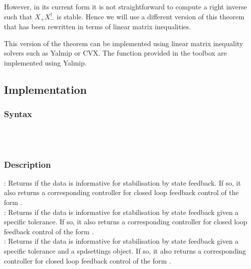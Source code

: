 However, in its current form it is not straightforward to compute a right inverse such that $X_+ X_-^\dagger$ is stable. Hence we will use a different version of this theorem that has been rewritten in terms of linear matrix inequalities.


This version of the theorem can be implemented using linear matrix inequality solvers such as Yalmip or CVX. The function provided in the toolbox are implemented using Yalmip.

\subsection{Implementation}
\subsubsection*{Syntax}
 \\
 \\

\subsubsection*{Description}
: Returns if the data is informative for stabilisation by state feedback. If so, it also returns a corresponding controller  for closed loop feedback control of the form .\\
: Returns if the data is informative for stabilisation by state feedback given a specific tolerance. If so, it also returns a corresponding controller  for closed loop feedback control of the form .\\
: Returns if the data is informative for stabilisation by state feedback given a specific tolerance and a spdsettings object. If so, it also returns a corresponding controller  for closed loop feedback control of the form .

